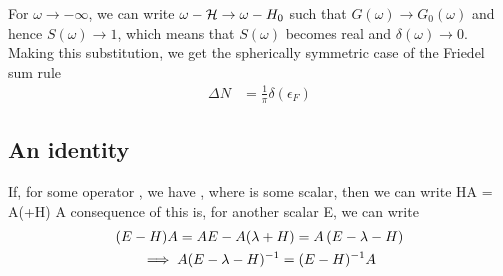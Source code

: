 \documentclass[12pt,twoside]{article}
\numberwithin{equation}{section}
\begin{document}
For \(\omega \to -\infty\), we can write \(\omega - \mathcal{H} \to \omega - H_0\) such that \(G(\omega) \to G_0(\omega)\) and hence \(S(\omega) \to 1\), which means that \(S(\omega)\) becomes real and \(\delta(\omega) \to 0\). Making this substitution, we get the spherically symmetric case of the Friedel sum rule
\begin{equation}\begin{aligned}
	\Delta N &= \frac{1}{\pi}\delta(\epsilon_F)
\end{aligned}\end{equation}






\subsection{An identity}
If, for some operator , we have , where \il{\lambda} is some scalar, then we can write
\beq
HA = A(\lambda+H)
\eeq
A consequence of this is, for another scalar E, we can write
\begin{gather}
(E - H)A = AE - A(\lambda+H) = A\left({E -\lambda -H}\right) \\
\implies A(E - \lambda - H)^{-1} = (E-H)^{-1}A\label{identity}
\end{gather}
\end{document}
